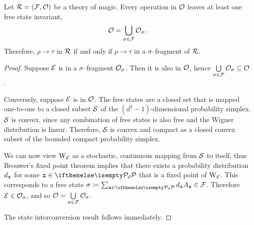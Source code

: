 \documentclass[pra,
aps,
twocolumn,
superscriptaddress,
groupedaddress,
nofootinbib,
reprint
]{revtex4-1}
\begin{document}
\begin{theorem}
    Let $\R = (\F, \O)$ be a theory of magic.
    Every operation in $\O$ leaves at least one free state invariant,
  \begin{equation}
\O = \bigcup\limits_{\sigma \in \F} \O_\sigma.
\end{equation}
Therefore, $\rho \longrightarrow \tau$ in $\R$ if and only if $\rho \longrightarrow \tau$ in a $\sigma$--fragment of $\R$.
\end{theorem}
\begin{proof}
    Suppose $\E$ is in a $\sigma$--fragment $\O_\sigma$.
    Then it is also in $\O$, hence $\bigcup\limits_{\sigma \in \F} \O_\sigma \subseteq \O$. 
    
    Conversely, suppose $\E$ is in $\O$. 
    The free states are a closed set that is mapped one-to-one to a closed subset $\cal{S}$ of the $(d^2 - 1)$-dimensional probability simplex.
    $\cal{S}$ is convex, since any combination of free states is also free and the Wigner distribution is linear.
    Therefore, $\cal{S}$ is convex and compact as a closed convex subset of the bounded compact probability simplex.
    
    We can now view $\W{\E}$ as a stochastic, continuous mapping from $\cal{S}$ to itself, thus Brouwer's fixed point theorem  implies that there exists a probability distribution $d_{\bmz}$ for some $ \bmz \in \pd$ that is a fixed point of $\W{\E}$.
    This corresponds to a free state $\sigma \coloneqq \sum_{\bmz \in \pd} d_{\bmz} A_{\bmz} \in \F$. 
    Therefore $\E \in \O_\sigma$, and so $\O = \bigcup\limits_{\sigma \in \F} \O_\sigma$. 
    
    The state interconversion result follows immediately.
\end{proof}
\end{document}
